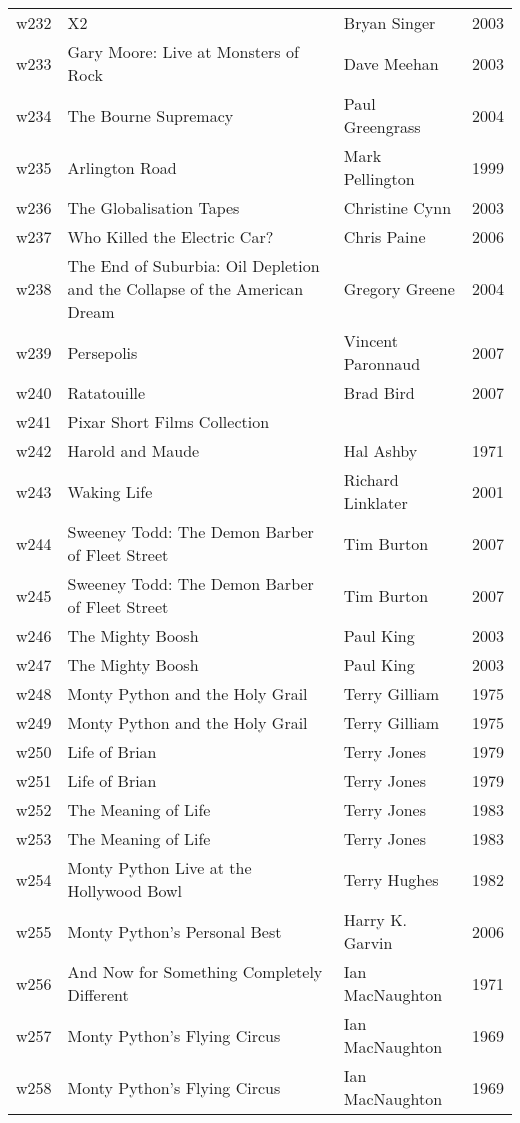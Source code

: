 \documentclass{article}
\begin{document}
\begin {center}
\begin{longtable}{l p{10cm} l l}
w232 & X2 & Bryan Singer & 2003 \\
w233 & Gary Moore: Live at Monsters of Rock & Dave Meehan & 2003 \\
w234 & The Bourne Supremacy & Paul Greengrass & 2004 \\
w235 & Arlington Road & Mark Pellington & 1999 \\
w236 & The Globalisation Tapes & Christine Cynn & 2003 \\
w237 & Who Killed the Electric Car? & Chris Paine & 2006 \\
w238 & The End of Suburbia: Oil Depletion and the Collapse of the American Dream & Gregory Greene & 2004 \\
w239 & Persepolis & Vincent Paronnaud & 2007 \\
w240 & Ratatouille & Brad Bird & 2007 \\
w241 & Pixar Short Films Collection &  &  \\
w242 & Harold and Maude & Hal Ashby & 1971 \\
w243 & Waking Life & Richard Linklater & 2001 \\
w244 & Sweeney Todd: The Demon Barber of Fleet Street & Tim Burton & 2007 \\
w245 & Sweeney Todd: The Demon Barber of Fleet Street & Tim Burton & 2007 \\
w246 & The Mighty Boosh & Paul King & 2003 \\
w247 & The Mighty Boosh & Paul King & 2003 \\
w248 & Monty Python and the Holy Grail & Terry Gilliam & 1975 \\
w249 & Monty Python and the Holy Grail & Terry Gilliam & 1975 \\
w250 & Life of Brian & Terry Jones & 1979 \\
w251 & Life of Brian & Terry Jones & 1979 \\
w252 & The Meaning of Life & Terry Jones & 1983 \\
w253 & The Meaning of Life & Terry Jones & 1983 \\
w254 & Monty Python Live at the Hollywood Bowl & Terry Hughes & 1982 \\
w255 & Monty Python's Personal Best & Harry K. Garvin & 2006 \\
w256 & And Now for Something Completely Different & Ian MacNaughton & 1971 \\
w257 & Monty Python's Flying Circus & Ian MacNaughton & 1969 \\
w258 & Monty Python's Flying Circus & Ian MacNaughton & 1969 \\

\end{longtable}
\end{center}
\end{document}
